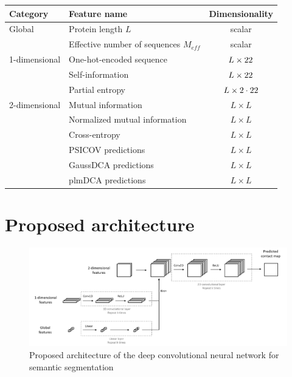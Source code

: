   \begin{table}[H]
    \centering
    \begin{tabular}{|l|l|c|}
      \hline
      Category & Feature name & Dimensionality \\
      \hline
      \hline
      Global & Protein length $L$ & scalar \\
             & Effective number of sequences $M_{eff}$ & scalar \\
      \hline
      1-dimensional & One-hot-encoded sequence & $L \times 22$ \\
                    & Self-information & $L \times 22$ \\
                    & Partial entropy & $L \times 2 \cdot 22$ \\
      \hline
      2-dimensional & Mutual information & $L \times L$ \\
                    & Normalized mutual information & $L \times L$ \\
                    & Cross-entropy & $L \times L$ \\
                    & PSICOV predictions & $L \times L$ \\
                    & GaussDCA predictions & $L \times L$ \\
                    & plmDCA predictions & $L \times L$ \\
      \hline
    \end{tabular}
    \label{hyperparams}
  \end{table}

\section{Proposed architecture}

  \begin{figure}[H]
    \begin{center}
      \includegraphics[width=\textwidth, keepaspectratio]{imgs/architecture.png}
       \caption{Proposed architecture of the deep convolutional neural network for semantic segmentation}
      \label{architecture}
    \end{center}
  \end{figure}

